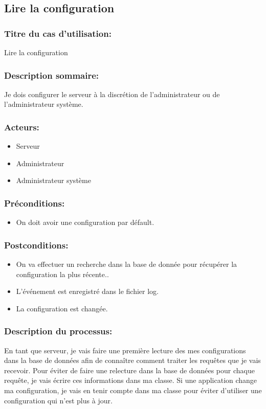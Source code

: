 \documentclass{scrreprt}
\begin{document}
\subsection{Lire la configuration}
\subsubsection{Titre du cas d'utilisation:} Lire la configuration
\subsubsection{Description sommaire:}Je dois configurer le serveur à la discrétion de l'administrateur ou de l'administrateur système. 
\subsubsection{Acteurs:}
\begin{itemize}
    \item Serveur
    \item Administrateur
    \item Administrateur système
\end{itemize}
\subsubsection{Préconditions:}
\begin{itemize}
    \item On doit avoir une configuration par défault.
\end{itemize} 
\subsubsection{Postconditions:}
\begin{itemize}
    \item On va effectuer un recherche dans la base de donnée pour récupérer la configuration la plus récente..
    \item L'événement est enregistré dans le fichier log.
    \item La configuration est changée.

\end{itemize} 
\subsubsection{Description du processus:}En tant que serveur, je vais faire une première lecture des mes configurations dans la base de données afin de connaître comment traiter les requêtes que je vais recevoir.
Pour éviter de faire une relecture dans la base de données pour chaque requête,
je vais écrire ces informations dans ma classe.
Si une application change ma configuration, je vais en tenir compte dans ma
classe pour éviter d'utiliser une configuration qui n'est plus à jour.
\end{document}
